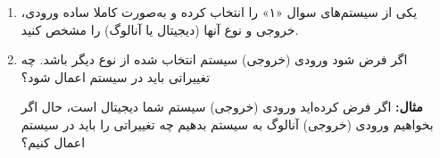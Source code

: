 \begin{enumerate}
	\item 
یکی از سیستم‌های سوال «۱» را انتخاب کرده و به‌صورت کاملا ساده ورودی، خروجی و نوع آنها (دیجیتال یا آنالوگ) را مشخص کنید.

	\item 
	اگر فرض شود ورودی (خروجی) سیستم انتخاب شده از نوع دیگر باشد. چه تغییراتی باید در سیستم اعمال شود؟
	
	\textbf{مثال:}
	 اگر فرض کرده‌اید ورودی (خروجی) سیستم شما دیجیتال است، حال اگر بخواهیم ورودی (خروجی) آنالوگ به سیستم بدهیم چه تغییراتی را باید در سیستم اعمال کنیم؟
	
	
\end{enumerate}